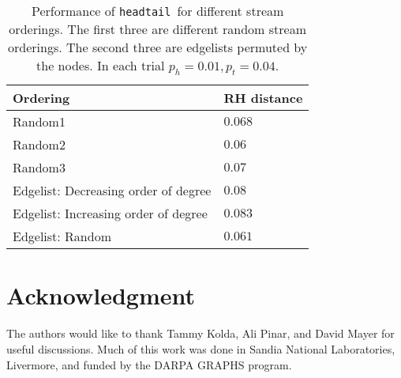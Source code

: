 \documentclass[11pt]{article}
\theoremstyle{definition}
\newcommand{\degdist}{{\tt headtail}}
\begin{document}
\begin{table}
\small
\centering
\begin{tabular}{l|l}
\hline
Ordering & RH distance\\
\hline\hline
Random1 & $0.068$\\\hline
Random2 & $0.06$\\\hline
Random3 & $0.07$\\\hline
Edgelist: Decreasing order of degree & $0.08$\\\hline
Edgelist: Increasing order of degree & $0.083$\\\hline
Edgelist: Random & $0.061$\\\hline
\end{tabular}\captionsetup{width=0.9\textwidth}
\caption{Performance of \degdist~for different stream orderings.  The first
three are different random stream orderings.  The second three are edgelists
permuted by the nodes.  In each trial $p_h = 0.01, p_t = 0.04$.}
\label{table:ordering}
\end{table}














\section*{Acknowledgment}

The authors would like to thank Tammy Kolda, Ali Pinar, and David Mayer for useful discussions.
Much of this work was done in Sandia National Laboratories, Livermore, and funded by the DARPA
GRAPHS program.













\end{document}
